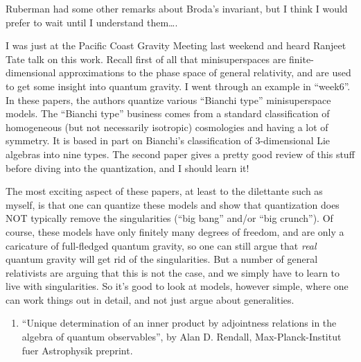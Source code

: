 \documentclass{article}
\def\tightlist{}
\renewcommand{\texttt}[1]{%
  \begingroup
  \ttfamily
  \begingroup\lccode`~=`/\lowercase{\endgroup\def~}{/\discretionary{}{}{}}%
  \begingroup\lccode`~=`[\lowercase{\endgroup\def~}{[\discretionary{}{}{}}%
  \begingroup\lccode`~=`.\lowercase{\endgroup\def~}{.\discretionary{}{}{}}%
  \catcode`/=\active\catcode`[=\active\catcode`.=\active
  \scantokens{#1\noexpand}%
  \endgroup
}
\begin{document}
Ruberman had some other remarks about Broda's invariant, but I think I
would prefer to wait until I understand them\ldots.


I was just at the Pacific Coast Gravity Meeting last weekend and heard
Ranjeet Tate talk on this work. Recall first of all that minisuperspaces
are finite-dimensional approximations to the phase space of general
relativity, and are used to get some insight into quantum gravity. I
went through an example in ``week6''. In these papers, the authors
quantize various ``Bianchi type'' minisuperspace models. The ``Bianchi
type'' business comes from a standard classification of homogeneous (but
not necessarily isotropic) cosmologies and having a lot of symmetry. It
is based in part on Bianchi's classification of 3-dimensional Lie
algebras into nine types. The second paper gives a pretty good review of
this stuff before diving into the quantization, and I should learn it!

The most exciting aspect of these papers, at least to the dilettante
such as myself, is that one can quantize these models and show that
quantization does NOT typically remove the singularities (``big bang''
and/or ``big crunch''). Of course, these models have only finitely many
degrees of freedom, and are only a caricature of full-fledged quantum
gravity, so one can still argue that \emph{real} quantum gravity will
get rid of the singularities. But a number of general relativists are
arguing that this is not the case, and we simply have to learn to live
with singularities. So it's good to look at models, however simple,
where one can work things out in detail, and not just argue about
generalities.

\begin{enumerate}
\def\labelenumi{\arabic{enumi})}
\setcounter{enumi}{2}
\tightlist
\item
  ``Unique determination of an inner product by adjointness relations in
  the algebra of quantum observables'', by Alan D. Rendall,
  Max-Planck-Institut fuer Astrophysik preprint.
\end{enumerate}
\end{document}
